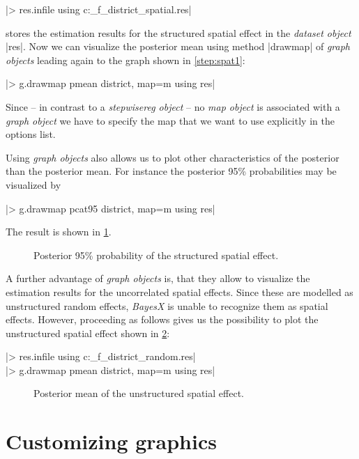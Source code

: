 |> res.infile using c:\data\s_f_district_spatial.res|

stores the estimation results for the structured spatial effect in the {\it dataset object} |res|. Now we can visualize the
posterior mean using method |drawmap| of {\it graph objects} leading again to the graph shown in \ref{step:spat1}:

|> g.drawmap pmean district, map=m using res|

Since -- in contrast to a {\it stepwisereg object} -- no {\it map object} is associated with a {\it graph object} we have to
specify the map that we want to use explicitly in the options list.

Using {\it graph objects} also allows us to plot other characteristics of the posterior than the posterior mean. For instance
the posterior 95\% probabilities may be visualized by

|> g.drawmap pcat95 district, map=m using res|

The result is shown in \ref{step:spat2}.

\begin{figure}[ht]
\begin{center}
{\it\caption{Posterior 95\% probability of the structured spatial
effect.\label{step:spat2}}}
\end{center}
\end{figure}

A further advantage of {\it graph objects} is, that they allow to visualize the estimation results for the uncorrelated spatial
effects. Since these are modelled as unstructured random effects, {\it BayesX} is unable to recognize them as spatial effects.
However, proceeding as follows gives us the possibility to plot the unstructured spatial effect shown in \ref{step:random1}:

|> res.infile using c:\data\s_f_district_random.res|\\
|> g.drawmap pmean district, map=m using res|

\begin{figure}[ht]
\begin{center}
{\it\caption{Posterior mean of the unstructured spatial
effect.\label{step:random1}}}
\end{center}
\end{figure}

\section{Customizing graphics}\label{step:custom}

